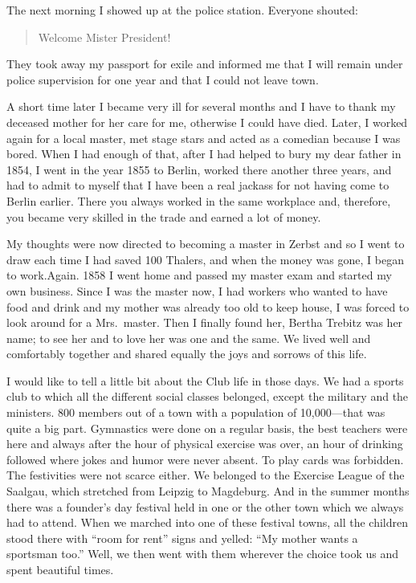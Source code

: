 The next morning I showed up at the police station. Everyone shouted:

\begin{quote}
Welcome Mister President!
\end{quote}

They took away my passport for exile and informed me that I will remain under police supervision for one year and that I could not leave town.

A short time later I became very ill for several months and I have to thank my deceased mother for her care for me, otherwise I could have died. Later, I worked again for a local master, met stage stars and acted as a comedian because I was bored. When I had enough of that, after I had helped to bury my dear father in 1854, I went in the year 1855 to Berlin, worked there another three years, and had to admit to myself that I have been a real jackass for not having come to Berlin earlier. There you always worked in the same workplace and, therefore, you became very skilled in the trade and earned a lot of money.

My thoughts were now directed to becoming a master in Zerbst and so I went to draw each time I had saved 100 Thalers, and when the money was gone, I began to work.Again. 1858 I went home and passed my master exam and started my own business. Since I was the master now, I had workers who wanted to have food and drink and my mother was already too old to keep house, I was forced to look around for a Mrs.~master. Then I finally found her, Bertha Trebitz was her name; to see her and to love her was one and the same. We lived well and comfortably together and shared equally the joys and sorrows of this life.

I would like to tell a little bit about the Club life in those days. We had a sports club to which all the different social classes belonged, except the military and the ministers. 800 members out of a town with a population of 10,000---that was quite a big part. Gymnastics were done on a regular basis, the best teachers were here and always after the hour of physical exercise was over, an hour of drinking followed where jokes and humor were never absent. To play cards was forbidden. The festivities were not scarce either. We belonged to the Exercise League of the Saalgau, which stretched from Leipzig to Magdeburg. And in the summer months there was a founder's day festival held in one or the other town which we always had to attend. When we marched into one of these festival towns, all the children stood there with ``room for rent'' signs and yelled: ``My mother wants a sportsman too.'' Well, we then went with them wherever the choice took us and spent beautiful times.

